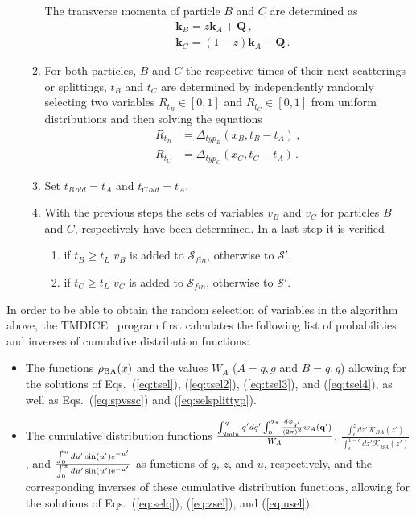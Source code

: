 \documentclass[preprint,12pt]{elsarticle}
\newcommand{\tmdice}{{\sf TMDICE}}
\begin{document}
\begin{enumerate}
\begin{enumerate}
\begin{equation}
        \end{equation}
        The transverse momenta of particle $B$ and $C$ are determined as
        \begin{align}
            &\mathbf{k}_B=z\mathbf{k}_A+\mathbf{Q}\,,\\
            &\mathbf{k}_C=(1-z)\mathbf{k}_A-\mathbf{Q}\,.
        \end{align}
        \item For both particles, $B$ and $C$ the respective times of their next scatterings or splittings, $t_B$ and $t_C$ are determined by independently randomly selecting two variables $R_{t_B}\in[0,1]$ and $R_{t_C}\in[0,1]$ from uniform distributions and then solving the equations
        \begin{align}
        R_{t_B}&=\Delta_{typ_B}(x_B,t_{B}-t_A)\,,
        \label{eq:tsel3}
        \\
        R_{t_C}&=\Delta_{typ_C}(x_C,t_{C}-t_A)\,.
        \label{eq:tsel4}
        \end{align}
        \item Set $t_{B\,old}=t_A$ and $t_{C\,old}=t_A$.
        \item With the previous steps the sets of variables $v_B$ and $v_C$ for particles $B$ and $C$, respectively have been determined.
        In a last step it is verified
        \begin{enumerate}
            \item if $t_B\geq t_L$ $v_B$ is added to $\mathcal{S}_{fin}$, otherwise to $\mathcal{S}'$,
            \item if $t_C\geq t_L$ $v_C$ is added to $\mathcal{S}_{fin}$, otherwise to $\mathcal{S}'$.
        \end{enumerate}
    \end{enumerate}
\end{enumerate}


In order to be able to obtain the random selection of variables in the algorithm above, the \tmdice~ program first calculates the following list of probabilities and inverses of cumulative distribution functions:
\begin{itemize}
\item The functions $\rho_{\rm BA}(x)$ and the values $W_A$ ($A=q,g$ and $B=q,g$) allowing for the solutions of Eqs.~(\ref{eq:tsel}), (\ref{eq:tsel2}), (\ref{eq:tsel3}), and (\ref{eq:tsel4}), as well as Eqs.~(\ref{eq:spvssc}) and (\ref{eq:selsplittyp}).
\item The cumulative distribution functions $\frac{\int_{q_{\rm min}}^q q'dq'\int_0^{2\pi}\frac{d\varphi_{q'}}{(2\pi)^2} w_A(\mathbf{q}') }{W_A}$, $\frac{\int_\epsilon^z dz'\mathcal{K}_{BA}(z')}{\int_\epsilon^{1-\epsilon} dz'\mathcal{K}_{BA}(z')}$, and $\frac{\int_0^u du' \sin (u') {\rm e}^{-u'}}{\int_0^\pi du' \sin (u') {\rm e}^{-u'}}$ as functions of $q$, $z$, and $u$, respectively, and the corresponding inverses of these cumulative distribution functions, allowing for the solutions of Eqs.~(\ref{eq:selq}), (\ref{eq:zsel}), and (\ref{eq:usel}).
\end{itemize}
\end{document}
